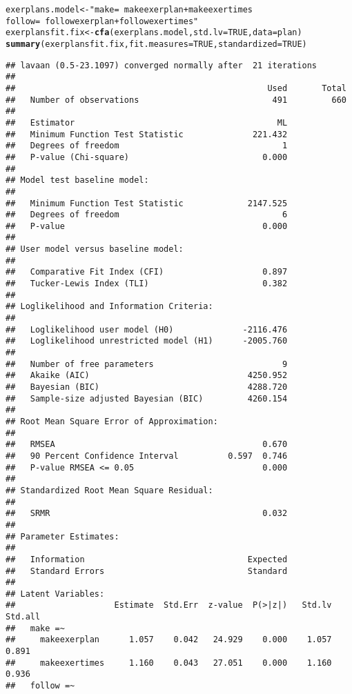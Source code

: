 \documentclass{article}\usepackage[]{graphicx}\usepackage[]{color}
\makeatletter
\newcommand{\hlnum}[1]{\textcolor[rgb]{0.686,0.059,0.569}{#1}}%
\newcommand{\hlstr}[1]{\textcolor[rgb]{0.192,0.494,0.8}{#1}}%
\newcommand{\hlstd}[1]{\textcolor[rgb]{0.345,0.345,0.345}{#1}}%
\newcommand{\hlkwb}[1]{\textcolor[rgb]{0.69,0.353,0.396}{#1}}%
\newcommand{\hlkwc}[1]{\textcolor[rgb]{0.333,0.667,0.333}{#1}}%
\newcommand{\hlkwd}[1]{\textcolor[rgb]{0.737,0.353,0.396}{\textbf{#1}}}%
\newenvironment{kframe}{%
 \def\at@end@of@kframe{}%
 \ifinner\ifhmode%
  \def\at@end@of@kframe{\end{minipage}}%
  \begin{minipage}{\columnwidth}%
 \fi\fi%
 \def\FrameCommand##1{\hskip\@totalleftmargin \hskip-\fboxsep
 \colorbox{shadecolor}{##1}\hskip-\fboxsep
     \hskip-\linewidth \hskip-\@totalleftmargin \hskip\columnwidth}%
 \MakeFramed {\advance\hsize-\width
   \@totalleftmargin\z@ \linewidth\hsize
   \@setminipage}}%
 {\par\unskip\endMakeFramed%
 \at@end@of@kframe}
\newenvironment{knitrout}{}{} %
\makeatother
\begin{document}
\begin{knitrout}
\begin{kframe}
\begin{alltt}
\hlstd{exerplans.model} \hlkwb{<-} \hlstr{" make  =~ makeexerplan +  makeexertimes     
              follow =~ followexerplan + followexertimes"}
\hlstd{exerplansfit.fix} \hlkwb{<-} \hlkwd{cfa}\hlstd{(exerplans.model,} \hlkwc{std.lv} \hlstd{=} \hlnum{TRUE}\hlstd{,} \hlkwc{data} \hlstd{= plan)}
\hlkwd{summary}\hlstd{(exerplansfit.fix,} \hlkwc{fit.measures} \hlstd{=} \hlnum{TRUE}\hlstd{,} \hlkwc{standardized} \hlstd{=} \hlnum{TRUE}\hlstd{)}
\end{alltt}
\begin{verbatim}
## lavaan (0.5-23.1097) converged normally after  21 iterations
## 
##                                                   Used       Total
##   Number of observations                           491         660
## 
##   Estimator                                         ML
##   Minimum Function Test Statistic              221.432
##   Degrees of freedom                                 1
##   P-value (Chi-square)                           0.000
## 
## Model test baseline model:
## 
##   Minimum Function Test Statistic             2147.525
##   Degrees of freedom                                 6
##   P-value                                        0.000
## 
## User model versus baseline model:
## 
##   Comparative Fit Index (CFI)                    0.897
##   Tucker-Lewis Index (TLI)                       0.382
## 
## Loglikelihood and Information Criteria:
## 
##   Loglikelihood user model (H0)              -2116.476
##   Loglikelihood unrestricted model (H1)      -2005.760
## 
##   Number of free parameters                          9
##   Akaike (AIC)                                4250.952
##   Bayesian (BIC)                              4288.720
##   Sample-size adjusted Bayesian (BIC)         4260.154
## 
## Root Mean Square Error of Approximation:
## 
##   RMSEA                                          0.670
##   90 Percent Confidence Interval          0.597  0.746
##   P-value RMSEA <= 0.05                          0.000
## 
## Standardized Root Mean Square Residual:
## 
##   SRMR                                           0.032
## 
## Parameter Estimates:
## 
##   Information                                 Expected
##   Standard Errors                             Standard
## 
## Latent Variables:
##                    Estimate  Std.Err  z-value  P(>|z|)   Std.lv  Std.all
##   make =~                                                               
##     makeexerplan      1.057    0.042   24.929    0.000    1.057    0.891
##     makeexertimes     1.160    0.043   27.051    0.000    1.160    0.936
##   follow =~                                                             

\end{verbatim}
\end{kframe}
\end{knitrout}
\end{document}
